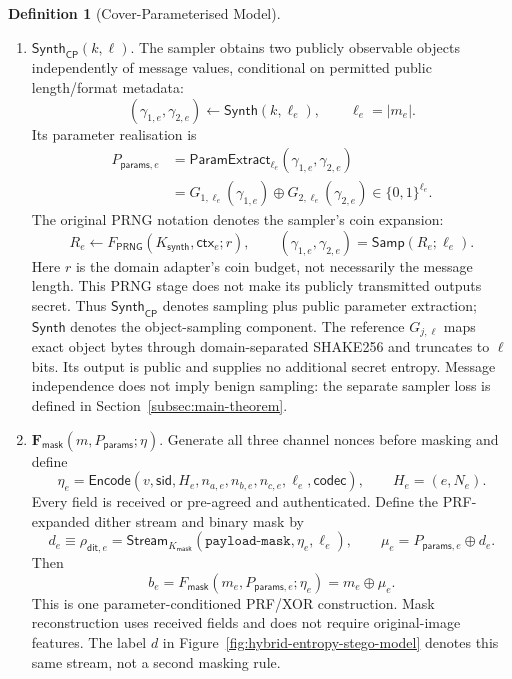 \documentclass[pdflatex,sn-mathphys-num]{sn-jnl}%
\theoremstyle{definition}
\newtheorem{definition}{Definition}[section]
\theoremstyle{game}
\theoremstyle{thmstyleone}%
\theoremstyle{thmstyletwo}%
\theoremstyle{thmstylethree}%
\begin{document}
\begin{definition}[Cover-Parameterised Model]
\begin{enumerate}[label=(\Alph*),leftmargin=2em]
\item $\boldsymbol{\mathsf{Synth}_{\mathsf{CP}}}(k,\ell)$.
The sampler obtains two publicly observable objects independently of message
values, conditional on permitted public length/format metadata:
\[
(\gamma_{1,e},\gamma_{2,e})\leftarrow\mathsf{Synth}(k,\ell_e),
\qquad \ell_e=|m_e|.
\]
Its parameter realisation is
\begin{equation}\label{eq:Pparams}
\begin{aligned}
P_{\mathsf{params},e}
 &=\mathsf{ParamExtract}_{\ell_e}(\gamma_{1,e},\gamma_{2,e})\\
 &=G_{1,\ell_e}(\gamma_{1,e})\oplus G_{2,\ell_e}(\gamma_{2,e})
 \in\{0,1\}^{\ell_e}.
\end{aligned}
\end{equation}
The original PRNG notation denotes the sampler's coin expansion:
\[
R_e\leftarrow F_{\mathsf{PRNG}}(K_{\mathsf{synth}},\mathsf{ctx}_e;r),\qquad
(\gamma_{1,e},\gamma_{2,e})=\mathsf{Samp}(R_e;\ell_e).
\]
Here $r$ is the domain adapter's coin budget, not necessarily the message
length. This PRNG stage does not make its publicly transmitted outputs secret.
Thus $\mathsf{Synth}_{\mathsf{CP}}$ denotes sampling plus public parameter
extraction; $\mathsf{Synth}$ denotes the object-sampling component.
The reference $G_{j,\ell}$ maps exact object bytes through domain-separated
SHAKE256 and truncates to $\ell$ bits. Its output is public and supplies no
additional secret entropy. Message independence does not imply benign
sampling: the separate sampler loss is defined in Section~\ref{subsec:main-theorem}.

\item $\boldsymbol{F_{\mathsf{mask}}}(m,P_{\mathsf{params}};\eta)$.
Generate all three channel nonces before masking and define
\begin{equation}\label{eq:receiver-context}
\eta_e=\mathsf{Encode}(v,\mathsf{sid},H_e,n_{a,e},n_{b,e},n_{c,e},
 \ell_e,\mathsf{codec}),\qquad H_e=(e,N_e).
\end{equation}
Every field is received or pre-agreed and authenticated. Define the
PRF-expanded dither stream and binary mask by
\[
d_e\equiv\rho_{\mathsf{dit},e}
=\mathsf{Stream}_{K_{\mathsf{mask}}}(\texttt{payload-mask},\eta_e,\ell_e),
\qquad \mu_e=P_{\mathsf{params},e}\oplus d_e.
\]
Then
\begin{equation}\label{eq:qim_mask}
b_e=F_{\mathsf{mask}}(m_e,P_{\mathsf{params},e};\eta_e)
=m_e\oplus\mu_e.
\end{equation}
This is one parameter-conditioned PRF/XOR construction. Mask reconstruction uses received fields and does not require original-image
features. The label $d$ in Figure~\ref{fig:hybrid-entropy-stego-model}
denotes this same stream, not a second masking rule.


\end{enumerate}
\end{definition}
\end{document}
